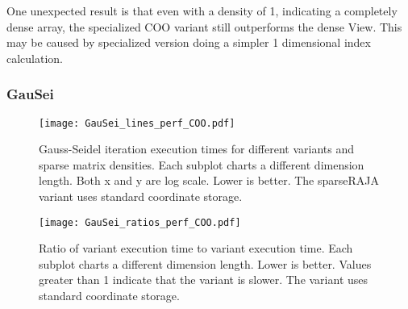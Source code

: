 


One unexpected result is that even with a density of 1, indicating a completely dense array, the specialized COO variant still outperforms the dense View. 
This may be caused by specialized version doing a simpler 1 dimensional index calculation.



\subsubsection{GauSei}
\begin{figure}
  \texttt{[image: GauSei\_lines\_perf\_COO.pdf]}
  \caption{Gauss-Seidel iteration execution times for different variants and sparse matrix densities. Each subplot charts a different dimension length. Both x and y are log scale. Lower is better. The sparseRAJA variant uses standard coordinate storage.}
\label{GauSeiPerfCOO}
\end{figure}
\begin{figure}
\texttt{[image: GauSei\_ratios\_perf\_COO.pdf]}
\caption{Ratio of \sparseraja{} variant execution time to \specialized{} variant execution time. Each subplot charts a different dimension length. Lower is better. Values greater than 1 indicate that the \sparseraja{} variant is slower. The \sparseraja{} variant uses standard coordinate storage.}
\label{GauSeiRatioCOO}
\end{figure}

